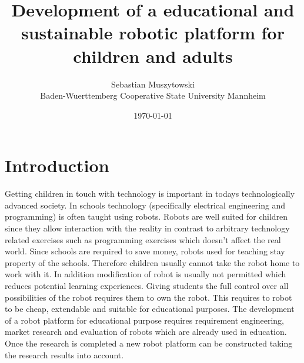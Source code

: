 \documentclass[11pt,a4paper]{article}
\title{Development of a educational and sustainable robotic platform for children and adults}
\date{\today}
\author{Sebastian Muszytowski \\Baden-Wuerttemberg Cooperative State University Mannheim }
\begin{document}
\maketitle


\section{Introduction}
Getting children in touch with technology is important in todays technologically advanced society. In schools technology (specifically electrical engineering and programming) is often taught using robots. Robots are well suited for children since they allow interaction with the reality in contrast to arbitrary technology related exercises such as programming exercises which doesn't affect the real world.\newline 
Since schools are required to save money, robots used for teaching stay property of the schools. Therefore children usually cannot take the robot home to work with it. In addition modification of robot is usually not permitted which reduces potential learning experiences. Giving students the full control over all possibilities of the robot requires them to own the robot. This requires to robot to be cheap, extendable and suitable for educational purposes.\newline
The development of a robot platform for educational purpose requires requirement engineering, market research and evaluation of robots which are already used in education. Once the research is completed a new robot platform can be constructed taking the research results into account.
\end{document}
